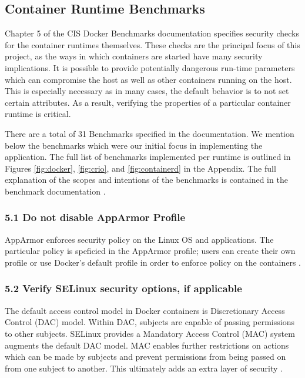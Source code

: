 \subsection*{Container Runtime Benchmarks}
Chapter 5 of the CIS Docker Benchmarks documentation specifies security checks for the container runtimes themselves. These checks are the principal focus of this project, as the ways in which containers are started have many security implications. It is possible
to provide potentially dangerous run-time parameters which can compromise the host as well as other containers running on the host. This is especially necessary as in many cases, the default behavior is to not set certain attributes. As a result, verifying the properties of a particular container runtime is critical. 

There are a total of 31 Benchmarks specified in the documentation. We mention below the benchmarks which were our initial focus in implementing the application. The full list of benchmarks implemented per runtime is outlined in Figures \ref{fig:docker}, \ref{fig:crio}, and \ref{fig:containerd} in the Appendix. The full explanation of the scopes and intentions of the benchmarks is contained in the benchmark documentation \cite[Ch. 5]{center_for_internet_security}.

 \subsubsection*{5.1 Do not disable AppArmor Profile} 
AppArmor enforces security policy on the Linux OS and applications. The particular policy is speficied in the AppArmor profile; users can create their own profile or use Docker's default profile in order to enforce policy on the containers \cite[pp 126-7]{center_for_internet_security}. 

\subsubsection*{5.2 Verify SELinux security options, if applicable} The default access control model in Docker containers is Discretionary Access Control (DAC) model. Within DAC, subjects are capable of passing permissions to other subjects. SELinux provides a Mandatory Access Control (MAC) system augments the default DAC model. MAC enables further restrictions on actions which can be made by subjects and prevent permissions from being passed on from one subject to another. This ultimately adds an extra layer of security \cite[128-9]{center_for_internet_security}.

